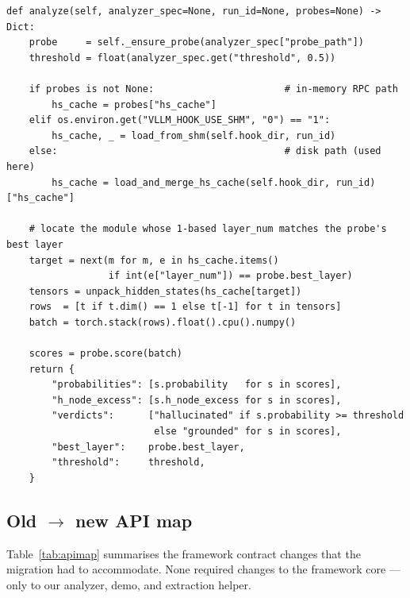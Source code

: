 \documentclass[11pt]{article}
\begin{document}
\begin{lstlisting}[style=py]
def analyze(self, analyzer_spec=None, run_id=None, probes=None) -> Dict:
    probe     = self._ensure_probe(analyzer_spec["probe_path"])
    threshold = float(analyzer_spec.get("threshold", 0.5))

    if probes is not None:                       # in-memory RPC path
        hs_cache = probes["hs_cache"]
    elif os.environ.get("VLLM_HOOK_USE_SHM", "0") == "1":
        hs_cache, _ = load_from_shm(self.hook_dir, run_id)
    else:                                        # disk path (used here)
        hs_cache = load_and_merge_hs_cache(self.hook_dir, run_id)["hs_cache"]

    # locate the module whose 1-based layer_num matches the probe's best layer
    target = next(m for m, e in hs_cache.items()
                  if int(e["layer_num"]) == probe.best_layer)
    tensors = unpack_hidden_states(hs_cache[target])
    rows  = [t if t.dim() == 1 else t[-1] for t in tensors]
    batch = torch.stack(rows).float().cpu().numpy()

    scores = probe.score(batch)
    return {
        "probabilities": [s.probability   for s in scores],
        "h_node_excess": [s.h_node_excess for s in scores],
        "verdicts":      ["hallucinated" if s.probability >= threshold
                          else "grounded" for s in scores],
        "best_layer":    probe.best_layer,
        "threshold":     threshold,
    }
\end{lstlisting}

\subsection{Old $\rightarrow$ new API map}
Table~\ref{tab:apimap} summarises the framework contract changes that the migration had to
accommodate. None required changes to the framework core --- only to our analyzer, demo, and
extraction helper.
\end{document}
